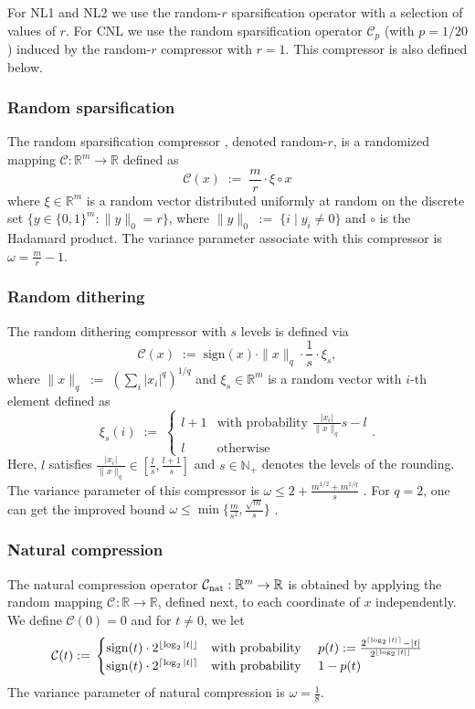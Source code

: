 \documentclass[12pt]{article}
\newcommand{\eqdef}{\; { := }\;}
\newcommand{\R}{\mathbb{R}}
\newcommand{\cC}{{\mathcal{C}}}
\begin{document}
For {\sf NL1} and {\sf NL2} we use the random-$r$ sparsification operator with a selection of values of $r$.  For {\sf CNL} we use the random sparsification operator $\cC_p$ (with $p=1/20$)  induced by the random-$r$ compressor with $r=1$. This compressor is also defined below.




\subsubsection{Random sparsification} The random sparsification compressor \citep{stich2018sparsified}, denoted random-$r$, is a randomized mapping $\cC:\R^m\to \R$ defined as $$\cC(x) \eqdef \frac{m}{r} \cdot \xi \circ x$$ where  $\xi \in \R^m$ is a random vector distributed uniformly at random on the discrete set $\{  y \in \{0, 1 \}^m : \|y\|_0 = r  \}$, where $\|y\|_0\eqdef \{i \;|\; y_i \neq 0\}$ and  $\circ$ is the Hadamard product. The variance  parameter associate with this compressor is $\omega = \frac{m}{r} - 1$. 

\subsubsection{Random dithering} The random dithering compressor \citep{Alistarh17, DIANA2} with $s$ levels is defined via 
$$\cC(x)\eqdef \text{sign}(x)\cdot \|x\|_q\cdot \frac{1}{s} \cdot \xi_s,$$ 
where $\|x\|_q\eqdef \left(\sum_i |x_i|^q\right)^{1/q}$ and $\xi_s\in\R^m$ is a random vector with 
$i$-th element  defined as
$$\xi_s(i)\eqdef \begin{cases}
	l+1 &\text {with probability } \frac{|x_i|}{\|x\|_q}s- l \\
	l &\text {otherwise}
\end{cases}.$$ Here, $l$ satisfies $\frac{|x_i|}{\|x\|_q}\in [\frac{l}{s}, \frac{l+1}{s}]$ and $s \in \mathbb{N}_+$ denotes the levels of the rounding. The variance parameter of this compressor is $\omega \leq 2 + \frac{m^{1/2} + m^{1/q}}{s}$ \citep{DIANA2}. For $q=2$, one can get the improved bound $\omega \leq \min\{  \frac{m}{s^2}, \frac{\sqrt{m}}{s}  \}$ \citep{Alistarh17}.  

\subsubsection{Natural compression} The natural compression  \citep{Cnat} operator $\cC_{\rm nat}:\R^m \to \R$ is obtained by applying the random mapping $\cC_{}:\R\to \R$, defined next, to each coordinate of $x$ independently. We define $\cC(0)=0$ and for $t\neq 0$, we let
$$
\cC(t) \eqdef \begin{cases}
	{\rm sign}(t) \cdot 2^{\lfloor \log_2|t| \rfloor } &\text {with probability } \quad p(t) \eqdef \frac{2^{\lceil \log_2|t| \rceil } - |t|}{2^{\lfloor \log_2|t| \rfloor }} \\
	{\rm sign}(t) \cdot 2^{\lceil \log_2|t| \rceil } &\text {with probability } \quad 1-p(t) 
\end{cases}
$$
The variance parameter of natural compression is $\omega = \frac{1}{8}$. 
\end{document}
